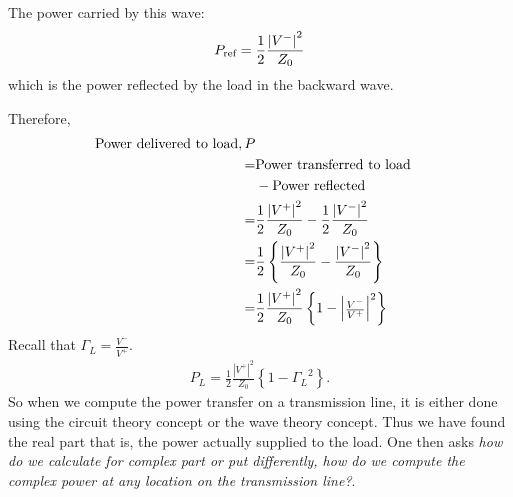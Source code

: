 The power carried by this wave:
\begin{align*}
P_{\textnormal{ref}} = \frac{1}{2}\frac{{|V^-|}^2}{Z_0}
\end{align*}
which is the power reflected by the load in the backward wave.

Therefore,
\begin{align*} 
\textnormal{Power delivered to load}, P\\
=& \textnormal{Power transferred to load}\\
&- \textnormal{Power reflected}\\
=& \frac{1}{2} \frac{{|V^+|}^2}{Z_0} -\frac{1}{2} \frac{{|V^-|}^2 }{Z_0}\\
=& \frac{1}{2} \left\lbrace \frac{{|V^+| }^2}{Z_0} -\frac{ {|V^-|}^2 }{Z_0} \right\rbrace\\
=& \frac{1}{2} \frac{{|V^+|}^2}{Z_0} \left\lbrace 1 - {
\begin{vmatrix}
\frac{V^-}{V^+}
\end{vmatrix}^2}\right\rbrace
\end{align*}
Recall that $\Gamma_L =\frac{V^-}{V^+}$.
\begin{align*}
P_L=\frac{1}{2} \frac{{|V^+|}^2}{Z_0} \left\lbrace 1 - { \Gamma_L }^2 \right\rbrace.
\end{align*}
So when we compute the power transfer on a transmission line, it is either done using the circuit theory concept or the wave theory concept. Thus we have found the real part that is, the power actually supplied to the load. One then asks \emph{how do we calculate for complex part or put differently, how do we compute the complex power at any location on the transmission line?}. 

